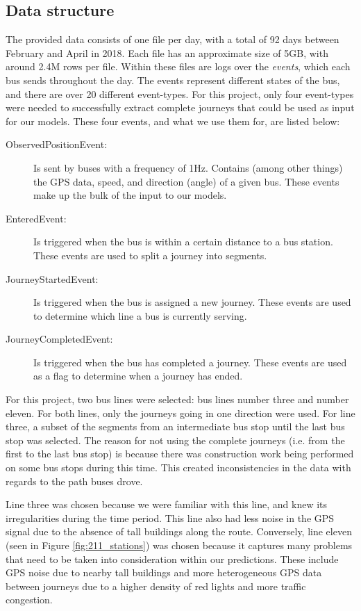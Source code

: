 \subsection{Data structure}
The provided data consists of one file per day, with a total of 92 days between February and April in 2018. Each file has an approximate size of 5GB, with around 2.4M rows per file. Within these files are logs over the \textit{events}, which each bus sends throughout the day. The events represent different states of the bus, and there are over 20 different event-types. For this project, only four event-types were needed to successfully extract complete journeys that could be used as input for our models. These four events, and what we use them for, are listed below:\\
\begin{description}
\item[ObservedPositionEvent:] Is sent by buses with a frequency of 1Hz. Contains (among other things) the GPS data, speed, and direction (angle) of a given bus. These events make up the bulk of the input to our models.
\item[EnteredEvent:] Is triggered when the bus is within a certain distance to a bus station. These events are used to split a journey into segments.
\item[JourneyStartedEvent:] Is triggered when the bus is assigned a new journey. These events are used to determine which line a bus is currently serving.
\item[JourneyCompletedEvent:] Is triggered when the bus has completed a journey. These events are used as a flag to determine when a journey has ended.
\end{description}

For this project, two bus lines were selected: bus lines number three and number eleven. For both lines, only the journeys going in one direction were used. For line three, a subset of the segments from an intermediate bus stop until the last bus stop was selected. The reason for not using the complete journeys (i.e. from the first to the last bus stop) is because there was construction work being performed on some bus stops during this time. This created inconsistencies in the data with regards to the path buses drove. 

Line three was chosen because we were familiar with this line, and knew its irregularities during the time period. This line also had less noise in the GPS signal due to the absence of tall buildings along the route. Conversely, line eleven (seen in Figure \ref{fig:211_stations}) was chosen because it captures many problems that need to be taken into consideration within our predictions. These include GPS noise due to nearby tall buildings and more heterogeneous GPS data between journeys due to a higher density of red lights and more traffic congestion.

